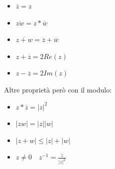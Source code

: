 \documentclass{article}
\theoremstyle{definition}
\begin{document}
\begin{itemize}
        \item $\overline{z} = z$ \\
        \item $\overline{zw} = z * \overline{w}$ \\
        \item $\overline{z+w} = \overline{z} + \overline{w}$ \\
        \item $z+\overline{z}=2Re(z)$ \\
        \item $z - \overline{z}=2Im(z)$ \\
\end{itemize}

Altre proprietà però con il modulo:
\begin{itemize}
        \item $z * \overline{z} =   |z|^{2}$ \\
        \item $|zw| = |z| |w|$ \\
        \item $|z+w| \le |z| + |w|$ \\
        \item $z \not = 0 \quad z^{-1} = \frac{\overline{z}}{|z|^{2}} $ \\
\end{itemize}
\end{document}

